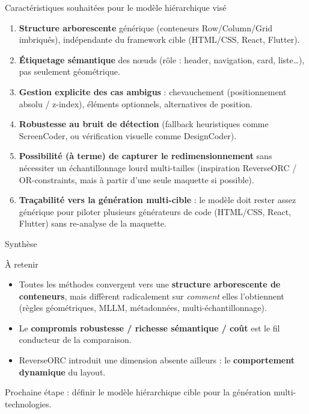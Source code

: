 \documentclass[10pt,aspectratio=169]{beamer}
\begin{document}
\begin{frame}{Caractéristiques souhaitées pour le modèle hiérarchique visé}
\begin{enumerate}
  \item \textbf{Structure arborescente} générique (conteneurs Row/Column/Grid imbriqués), indépendante du framework cible (HTML/CSS, React, Flutter).
  \item \textbf{Étiquetage sémantique} des n\oe uds (rôle : header, navigation, card, liste\ldots), pas seulement géométrique.
  \item \textbf{Gestion explicite des cas ambigus} : chevauchement (positionnement absolu / z-index), éléments optionnels, alternatives de position.
  \item \textbf{Robustesse au bruit de détection} (fallback heuristiques comme ScreenCoder, ou vérification visuelle comme DesignCoder).
  \item \textbf{Possibilité (à terme) de capturer le redimensionnement} sans nécessiter un échantillonnage lourd multi-tailles (inspiration ReverseORC / OR-constraints, mais à partir d'une seule maquette si possible).
  \item \textbf{Traçabilité vers la génération multi-cible} : le modèle doit rester assez générique pour piloter plusieurs générateurs de code (HTML/CSS, React, Flutter) sans re-analyse de la maquette.
\end{enumerate}
\end{frame}

\begin{frame}{Synthèse}
\begin{block}{À retenir}
\begin{itemize}
  \item Toutes les méthodes convergent vers une \textbf{structure arborescente de conteneurs}, mais diffèrent radicalement sur \emph{comment} elles l'obtiennent (règles géométriques, MLLM, métadonnées, multi-échantillonnage).
  \item Le \textbf{compromis robustesse / richesse sémantique / coût} est le fil conducteur de la comparaison.
  \item ReverseORC introduit une dimension absente ailleurs : le \textbf{comportement dynamique} du layout.
\end{itemize}
\end{block}
\vspace{3mm}
\centering
\Large Prochaine étape : définir le modèle hiérarchique cible pour la génération multi-technologies.
\end{frame}
\end{document}
